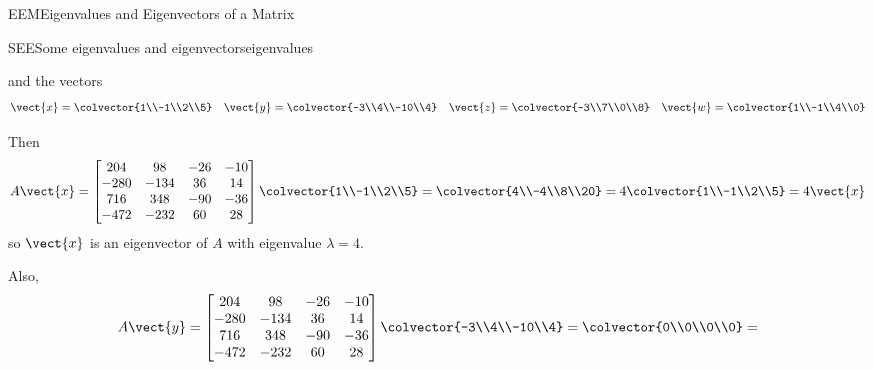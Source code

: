 \begin{subsect}{EEM}{Eigenvalues and Eigenvectors of a Matrix}
\begin{example}{SEE}{Some eigenvalues and eigenvectors}{eigenvalues}
\begin{para}
\begin{equation*}
\end{equation*}
%
and the vectors
%
\begin{align*}
\vect{x}=\colvector{1\\-1\\2\\5}&&     %
\vect{y}=\colvector{-3\\4\\-10\\4}&&  %
\vect{z}=\colvector{-3\\7\\0\\8}&&     %
\vect{w}=\colvector{1\\-1\\4\\0}        %
\end{align*}
\end{para}
%
\begin{para}Then
%
\begin{equation*}
A\vect{x}=
\begin{bmatrix}
204 & 98 & -26 & -10\\
-280 & -134 & 36 & 14\\
716 & 348 & -90 & -36\\
-472 & -232 & 60 & 28
\end{bmatrix}
\colvector{1\\-1\\2\\5}=
\colvector{4\\-4\\8\\20}=
4\colvector{1\\-1\\2\\5}=4\vect{x}
%
\end{equation*}
%
so $\vect{x}$ is an eigenvector of $A$ with eigenvalue $\lambda=4$.\end{para}
%
\begin{para}Also,
%
\begin{equation*}
A\vect{y}=
\begin{bmatrix}
204 & 98 & -26 & -10\\
-280 & -134 & 36 & 14\\
716 & 348 & -90 & -36\\
-472 & -232 & 60 & 28
\end{bmatrix}
\colvector{-3\\4\\-10\\4}=
\colvector{0\\0\\0\\0}=

\end{equation*}
\end{para}
\end{example}
\end{subsect}
